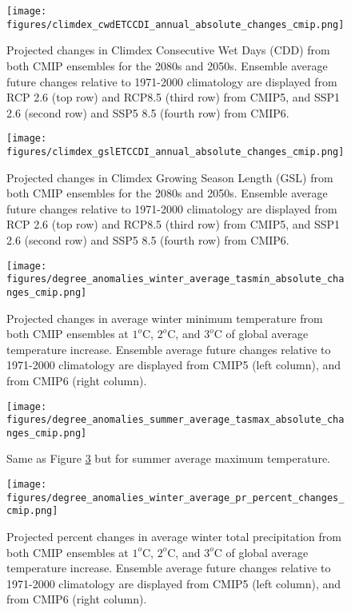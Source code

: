 \documentclass[]{scrartcl}
\begin{document}
\begin{appendices}
\begin{figure}[ht!]
	\centering
	\texttt{[image: figures/climdex\_cwdETCCDI\_annual\_absolute\_changes\_cmip.png]}
	\caption[CDD]{Projected changes in Climdex Consecutive Wet Days (CDD) from both CMIP ensembles for the 2080s and 2050s. Ensemble average future changes relative to 1971-2000 climatology are displayed from RCP 2.6 (top row) and RCP8.5 (third row) from CMIP5, and SSP1 2.6 (second row) and SSP5 8.5 (fourth row) from CMIP6.}
	\label{fig:climdex_cwd_future}
\end{figure}	

\begin{figure}[ht!]
	\centering
	\texttt{[image: figures/climdex\_gslETCCDI\_annual\_absolute\_changes\_cmip.png]}
	\caption[CDD]{Projected changes in Climdex Growing Season Length (GSL) from both CMIP ensembles for the 2080s and 2050s. Ensemble average future changes relative to 1971-2000 climatology are displayed from RCP 2.6 (top row) and RCP8.5 (third row) from CMIP5, and SSP1 2.6 (second row) and SSP5 8.5 (fourth row) from CMIP6.}
	\label{fig:climdex_gsl_future}
\end{figure}	
	
\begin{figure}[ht!]
	\centering
	\texttt{[image: figures/degree\_anomalies\_winter\_average\_tasmin\_absolute\_changes\_cmip.png]}
	\caption[Pr]{Projected changes in average winter minimum temperature from both CMIP ensembles at $1^o$C, $2^o$C, and $3^o$C of global average temperature increase. Ensemble average future changes relative to 1971-2000 climatology are displayed from CMIP5 (left column), and from CMIP6 (right column).}
	\label{fig:win_tasmin_deg_anoms}
\end{figure}

\begin{figure}[ht!]
	\centering
	\texttt{[image: figures/degree\_anomalies\_summer\_average\_tasmax\_absolute\_changes\_cmip.png]}
	\caption[Pr]{Same as Figure \ref{fig:win_tasmin_deg_anoms} but for summer average maximum temperature.}
	\label{fig:sum_tasmax_deg_anoms}
\end{figure}




\begin{figure}[ht!]
	\centering
	\texttt{[image: figures/degree\_anomalies\_winter\_average\_pr\_percent\_changes\_cmip.png]}
	\caption[Pr]{Projected percent changes in average winter total precipitation from both CMIP ensembles at $1^o$C, $2^o$C, and $3^o$C of global average temperature increase. Ensemble average future changes relative to 1971-2000 climatology are displayed from CMIP5 (left column), and from CMIP6 (right column).}
	\label{fig:win_pr_deg_anoms}
\end{figure}


\end{appendices}
\end{document}
